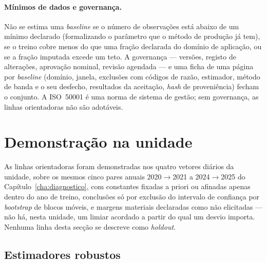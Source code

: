 \paragraph{Mínimos de dados e governança.} Não se estima uma \emph{baseline}
se o número de observações está abaixo de um mínimo declarado (formalizando
o parâmetro que o método de produção já tem), se o treino cobre menos do que
uma fração declarada do domínio de aplicação, ou se a fração imputada excede
um teto. A governança --- versões, registo de alterações, aprovação nominal,
revisão agendada --- e uma ficha de uma página por \emph{baseline} (domínio,
janela, exclusões com códigos de razão, estimador, método de banda e o seu
desfecho, resultados da aceitação, \emph{hash} de proveniência) fecham o
conjunto. A ISO~50001 é uma norma de sistema de gestão; sem governança, as
linhas orientadoras não são adotáveis.

\section{Demonstração na unidade}
\label{sec:demonstracao}

As linhas orientadoras foram demonstradas nos quatro vetores diários da
unidade, sobre os mesmos cinco pares anuais 2020${\to}$2021 a
2024${\to}$2025 do Capítulo~\ref{cha:diagnostico}, com constantes fixadas a
priori ou afinadas apenas dentro do ano de treino, conclusões só por
exclusão do intervalo de confiança por \emph{bootstrap} de blocos móveis, e
margens materiais declaradas como não elicitadas --- não há, nesta unidade,
um limiar acordado a partir do qual um desvio importa. Nenhuma linha desta
secção se descreve como \emph{holdout}.

\subsection{Estimadores robustos}
\label{sec:demo-robustos}

